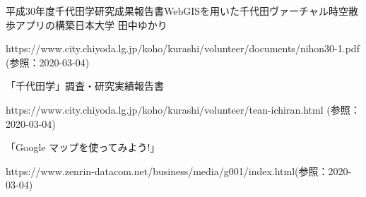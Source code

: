 \documentclass[a4paper, twoside]{jarticle}
\begin{document}
\begin{thebibliography}{99}

平成30年度千代田学研究成果報告書WebGISを用いた千代田ヴァーチャル時空散歩アプリの構築日本大学 田中ゆかり\par
https://www.city.chiyoda.lg.jp/koho/kurashi/volunteer/documents/nihon30-1.pdf (参照：2020-03-04)

「千代田学」調査・研究実績報告書\par
https://www.city.chiyoda.lg.jp/koho/kurashi/volunteer/tean-ichiran.html (参照：2020-03-04)


 「Google マップを使ってみよう!」\par
https://www.zenrin-datacom.net/business/media/g001/index.html(参照：2020-03-04)



\end{thebibliography}
\end{document}
